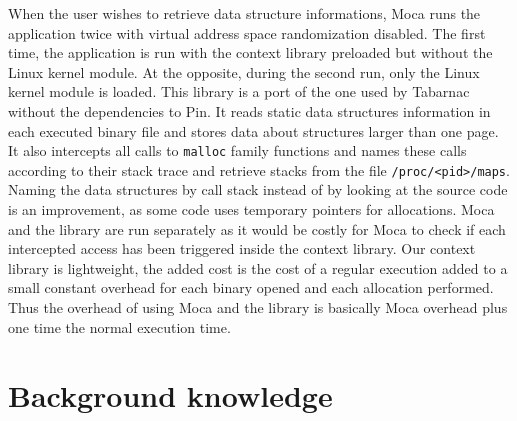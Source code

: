When the user wishes to retrieve data structure informations, \gls{Moca} runs the application twice with virtual address space randomization disabled.
The first time, the application is run with the context library preloaded but without the \gls{Linux} kernel module.
At the opposite, during the second run, only the \gls{Linux} kernel module is loaded.
This library is a port of the one used by \gls{Tabarnac} without the dependencies to \gls{Pin}.
It reads static data structures information in each executed binary file and stores data about structures larger than one page.
It also intercepts all calls to \texttt{malloc} family functions and names these calls according to their stack trace and retrieve stacks from the file \texttt{/proc/<pid>/maps}.
Naming the data structures by call stack instead of by looking at the source code is an improvement, as some code uses temporary pointers for allocations.
\gls{Moca} and the library are run separately as it would be costly for \gls{Moca} to check if each intercepted access has been triggered inside the context library.
Our context library is lightweight, the added cost is the cost of a regular execution added to a small constant overhead for each binary opened and each allocation performed.
Thus the overhead of using \gls{Moca} and the library is basically \gls{Moca} overhead plus one time the normal execution time.

\section{Background knowledge}
\label{sec:moca-bg}

